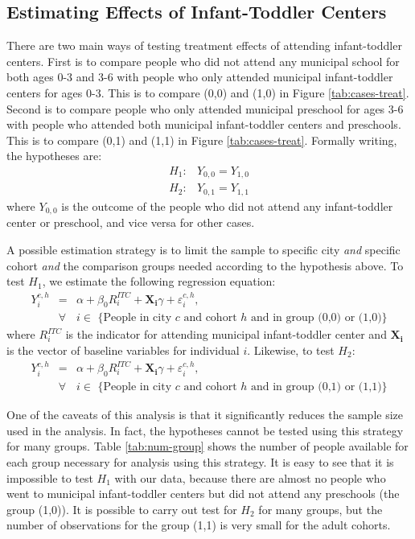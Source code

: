 \subsection{Estimating Effects of Infant-Toddler Centers}
There are two main ways of testing treatment effects of attending infant-toddler centers. First is to compare people who did not attend any municipal school for both ages 0-3 and 3-6 with people who only attended municipal infant-toddler centers for ages 0-3. This is to compare (0,0) and (1,0) in Figure \ref{tab:cases-treat}. Second is to compare people who only attended municipal preschool for ages 3-6 with people who attended both municipal infant-toddler centers and preschools. This is to compare (0,1) and (1,1) in Figure \ref{tab:cases-treat}. Formally writing, the hypotheses are:
\begin{eqnarray}
H_1: &  Y_{0,0} = Y_{1,0} \\ 
H_2: &  Y_{0,1} = Y_{1,1} 
\end{eqnarray}
where $Y_{0,0}$ is the outcome of the people who did not attend any infant-toddler center or preschool, and vice versa for other cases. 

A possible estimation strategy is to limit the sample to specific city \textit{and} specific cohort \textit{and} the comparison groups needed according to the hypothesis above. To test $H_1$, we estimate the following regression equation:
\begin{eqnarray}
Y_{i}^{c,h} & = & \alpha + \beta_{0}R_i^{ITC} + \mathbf{X_i}\gamma + \varepsilon_{i}^{c,h}, \\ \nonumber
& \forall & i \in \text{ \{People in city $c$ and cohort $h$ and in group (0,0) or (1,0)\}}
\end{eqnarray}
where $R_i^{ITC}$ is the indicator for attending municipal infant-toddler center and $\mathbf{X_i}$ is the vector of baseline variables for individual $i$. Likewise, to test $H_2$:
\begin{eqnarray}
Y_{i}^{c,h} & = & \alpha + \beta_{0}R_i^{ITC} + \mathbf{X_i}\gamma + \varepsilon_{i}^{c,h}, \\ \nonumber
& \forall & i \in \text{ \{People in city $c$ and cohort $h$ and in group (0,1) or (1,1)\}}
\end{eqnarray}

One of the caveats of this analysis is that it significantly reduces the sample size used in the analysis. In fact, the hypotheses cannot be tested using this strategy for many groups. Table \ref{tab:num-group} shows the number of people available for each group necessary for analysis using this strategy. It is easy to see that it is impossible to test $H_1$ with our data, because there are almost no people who went to municipal infant-toddler centers but did not attend any preschools (the group (1,0)). It is possible to carry out test for $H_2$ for many groups, but the number of observations for the group (1,1) is very small for the adult cohorts. 

